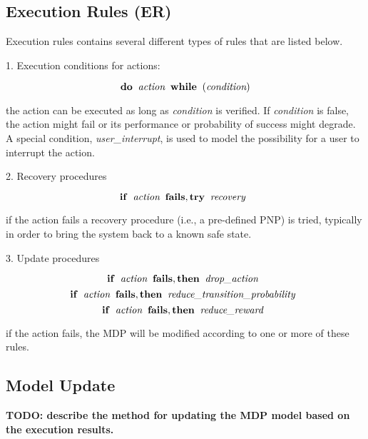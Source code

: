


\subsection{Execution Rules (ER)}

Execution rules contains several different types of rules that are listed below.

\vspace{0.5cm}

1. Execution conditions for actions:

\[ \mathbf{do} \;\; \emph{action} \;\; \mathbf{while} \;\; ( \emph{condition} ) \]

\noindent
the action can be executed as long as \emph{condition} is verified.
If \emph{condition} is false, the action might fail or its performance or probability of success might degrade.
A special condition, \emph{user\_interrupt}, is used to model the possibility for a user to interrupt the action.

\vspace{0.5cm}

2. Recovery procedures

\[ \mathbf{if} \;\; \emph{action} \;\; \mathbf{fails, try} \;\; \emph{recovery} \;\; \]

\noindent
if the action fails a recovery procedure (i.e., a pre-defined PNP) is tried, typically in order to bring the system back to a known safe state.


\vspace{0.5cm}

3. Update procedures

\[ \mathbf{if} \;\; \emph{action} \;\; \mathbf{fails, then} \;\; \emph{drop\_action} \;\; \]
\[ \mathbf{if} \;\; \emph{action} \;\; \mathbf{fails, then} \;\; \emph{reduce\_transition\_probability} \;\; \]
\[ \mathbf{if} \;\; \emph{action} \;\; \mathbf{fails, then} \;\; \emph{reduce\_reward} \;\; \]



\noindent
if the action fails, the MDP will be modified according to one or more of these rules.






\subsection{Model Update}


\vspace{0.5cm}
{\bf TODO: describe the method for updating the MDP model based on the execution results.}
\vspace{0.5cm}





